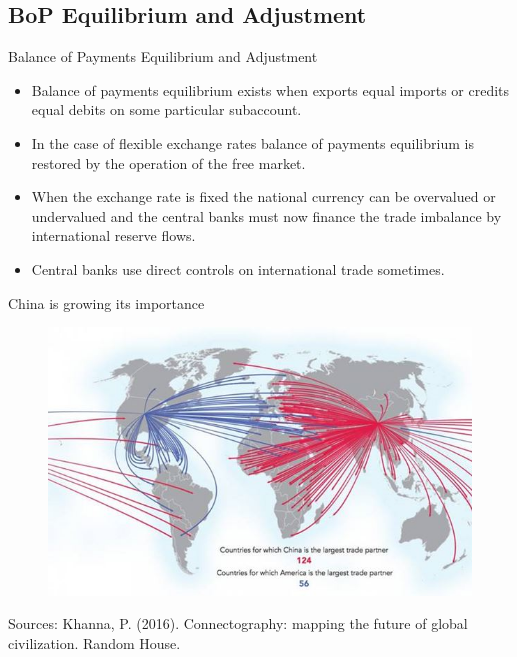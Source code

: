 \documentclass[international_finance_p1.tex]{subfiles}
\begin{document}
\subsection{BoP Equilibrium and Adjustment}
\begin{frame}{Balance of Payments Equilibrium and Adjustment}
\begin{itemize}[<+->]
\item
Balance of payments equilibrium exists when exports equal imports or credits equal debits on some particular subaccount. 
\item
In the case of flexible exchange rates balance of payments equilibrium is restored by the operation of the free market. 
\item
When the exchange rate is fixed the national currency can be overvalued or undervalued and the central banks must now finance the trade imbalance by international reserve flows.
\item
Central banks use direct controls on international trade sometimes.
\end{itemize}
\end{frame}

\begin{frame}{China is growing its importance}
\begin{figure}
	\includegraphics[scale=0.5]{img/China_US_Trade_Partners}
\end{figure}
Sources: Khanna, P. (2016). Connectography: mapping the future of global civilization. Random House.
\end{frame}
\end{document}
